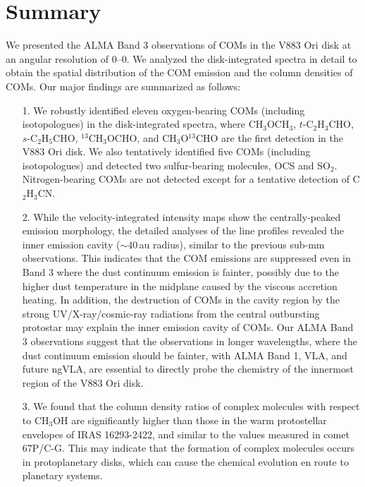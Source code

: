 \documentclass[linenumbers, twocolumn, twocolappendix, astrosymb, times]{aastex631}
\newcommand{\methanol}{CH$_3$OH\xspace}
\newcommand{\methylformate}{CH$_3$OCHO\xspace}
\newcommand{\dimethylether}{CH$_3$OCH$_3$\xspace}
\newcommand{\propenal}{$t$-C$_2$H$_3$CHO\xspace}
\newcommand{\propanal}{$s$-C$_2$H$_5$CHO\xspace}
\begin{document}
\section{Summary} \label{sec:summary}
We presented the ALMA Band 3 observations of COMs in the V883 Ori disk at an angular resolution of 0--0. We analyzed the disk-integrated spectra in detail to obtain the spatial distribution of the COM emission and the column densities of COMs. Our major findings are summarized as follows:
\begin{enumerate}
    \item[1.] We robustly identified eleven oxygen-bearing COMs (including isotopologues) in the disk-integrated spectra, where \dimethylether, \propenal, \propanal, $^{13}$\methylformate, and CH$_3$O$^{13}$CHO are the first detection in the V883 Ori disk. We also tentatively identified five COMs (including isotopologues) and detected two sulfur-bearing molecules, OCS and SO$_2$. Nitrogen-bearing COMs are not detected except for a tentative detection of C$_2$H$_3$CN.
    \item[2.] While the velocity-integrated intensity maps show the centrally-peaked emission morphology, the detailed analyses of the line profiles revealed the inner emission cavity ($\sim40$\,au radius), similar to the previous sub-mm observations. This indicates that the COM emissions are suppressed even in Band 3 where the dust continuum emission is fainter, possibly due to the higher dust temperature in the midplane caused by the viscous accretion heating. In addition, the destruction of COMs in the cavity region by the strong UV/X-ray/cosmic-ray radiations from the central outbursting protostar may explain the inner emission cavity of COMs.  Our ALMA Band 3 observations suggest that the observations in longer wavelengths, where the dust continuum emission should be fainter, with ALMA Band 1, VLA, and future ngVLA, are essential to directly probe the chemistry of the innermost region of the V883 Ori disk.
    
    \item[3.] We found that the column density ratios of complex molecules with respect to \methanol are significantly higher than those in the warm protostellar envelopes of IRAS 16293-2422, and similar to the values measured in comet 67P/C-G. This may indicate that the formation of complex molecules occurs in protoplanetary disks, which can cause the chemical evolution en route to planetary systems.
    

\end{enumerate}
\end{document}
